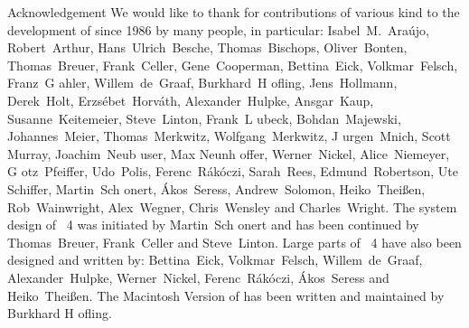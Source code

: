 {\obeylines
{\secfont Acknowledgement}
\bigskip
We would like to thank for contributions of various kind to the development
of {\GAP} since 1986 by many people, in particular:
\medskip
Isabel~M.~Ara{\'u}jo, Robert~Arthur, Hans~Ulrich~Besche, Thomas~Bischops,
Oliver~Bonten, Thomas~Breuer, Frank~Celler, Gene~Cooperman, Bettina~Eick,
Volkmar~Felsch, Franz~G{ a}hler, Willem~de~Graaf, Burkhard~H{ o}fling,
Jens~Hollmann, Derek~Holt, Erzs{\'e}bet~Horv{\'a}th, Alexander~Hulpke, Ansgar~Kaup,
Susanne~Keitemeier, Steve~Linton, Frank~L{ u}beck, Bohdan~Majewski,
Johannes~Meier, Thomas~Merkwitz, Wolfgang~Merkwitz, J{ u}rgen~Mnich,
Scott Murray, Joachim~Neub{ u}ser, Max Neunh{ o}ffer,
Werner~Nickel, Alice~Niemeyer, G{ o}tz~Pfeiffer, Udo~Polis,
Ferenc~R{\'a}k{\'o}czi, Sarah~Rees, Edmund~Robertson, Ute Schiffer,
Martin~Sch{ o}nert, {\'A}kos~Seress, Andrew~Solomon, Heiko~Thei{\ss}en,
Rob~Wainwright, Alex~Wegner, Chris~Wensley  and Charles~Wright.
\bigskip \bigskip \bigskip
The system design of {\GAP}~4 was initiated by
Martin~Sch{ o}nert and has been continued by
Thomas~Breuer, Frank~Celler and Steve~Linton.
\bigskip
Large parts of {\GAP}~4 have also been designed and written by:
\medskip
Bettina~Eick, Volkmar~Felsch, Willem~de~Graaf, Alexander~Hulpke,
Werner~Nickel, Ferenc~R{\'a}k{\'o}czi, {\'A}kos~Seress and Heiko~Thei{\ss}en.
\bigskip
The Macintosh Version of {\GAP} has been written and maintained by Burkhard
H{ o}fling.
}
